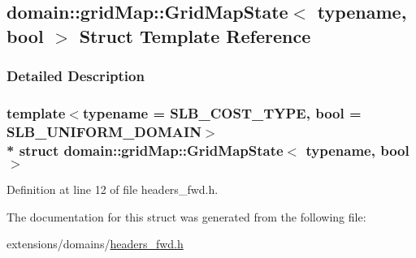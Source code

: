 \hypertarget{structdomain_1_1gridMap_1_1GridMapState}{}\subsection{domain\+:\+:grid\+Map\+:\+:Grid\+Map\+State$<$ typename, bool $>$ Struct Template Reference}
\label{structdomain_1_1gridMap_1_1GridMapState}


\subsubsection{Detailed Description}
\subsubsection*{template$<$typename = S\+L\+B\+\_\+\+C\+O\+S\+T\+\_\+\+T\+Y\+PE, bool = S\+L\+B\+\_\+\+U\+N\+I\+F\+O\+R\+M\+\_\+\+D\+O\+M\+A\+IN$>$\\*
struct domain\+::grid\+Map\+::\+Grid\+Map\+State$<$ typename, bool $>$}



Definition at line 12 of file headers\+\_\+fwd.\+h.



The documentation for this struct was generated from the following file\+:\begin{DoxyCompactItemize}
\item 
extensions/domains/\hyperlink{domains_2headers__fwd_8h}{headers\+\_\+fwd.\+h}\end{DoxyCompactItemize}
